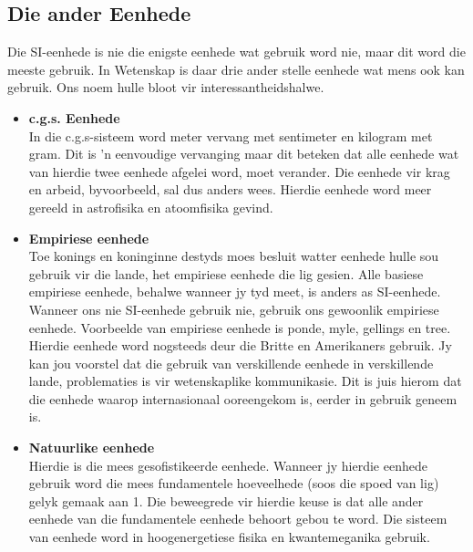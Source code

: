  \subsection*{Die ander Eenhede}
            \nopagebreak
Die SI-eenhede is nie die enigste eenhede wat gebruik word nie, maar dit word die meeste gebruik. In Wetenskap is daar drie ander stelle eenhede wat mens ook kan gebruik. Ons noem hulle bloot vir interessantheidshalwe. 
\begin{itemize}
 \item \textbf{c.g.s. Eenhede} \\
In die c.g.s-sisteem word meter vervang met sentimeter en kilogram met gram. Dit is  'n eenvoudige vervanging maar dit beteken dat alle eenhede wat van hierdie twee eenhede afgelei word, moet verander. Die eenhede vir krag en arbeid, byvoorbeeld, sal dus anders wees. Hierdie eenhede word meer gereeld in astrofisika en atoomfisika gevind.
\item \textbf{Empiriese eenhede} \\
Toe konings en koninginne destyds moes besluit watter eenhede hulle sou gebruik vir die lande, het empiriese eenhede die lig gesien. Alle basiese empiriese eenhede, behalwe wanneer jy tyd meet, is anders as SI-eenhede. Wanneer ons nie SI-eenhede gebruik nie, gebruik ons gewoonlik empiriese eenhede. Voorbeelde van empiriese eenhede is ponde, myle, gellings en tree. Hierdie eenhede word nogsteeds deur die Britte en Amerikaners gebruik. Jy kan jou voorstel dat die gebruik van verskillende eenhede in verskillende lande, problematies is vir wetenskaplike kommunikasie. Dit is juis hierom dat die eenhede waarop internasionaal ooreengekom is, eerder in gebruik geneem is.
\item \textbf{Natuurlike eenhede} \\
Hierdie is die mees gesofistikeerde eenhede. Wanneer jy hierdie eenhede gebruik word die mees fundamentele hoeveelhede (soos die spoed van lig) gelyk gemaak aan 1. Die beweegrede vir hierdie keuse is dat alle ander eenhede van die fundamentele eenhede behoort gebou te word. Die sisteem van eenhede word in hoogenergetiese fisika en kwantemeganika gebruik. 
\end{itemize}
